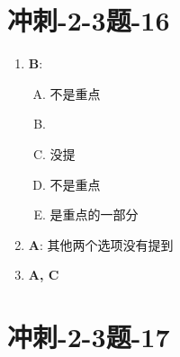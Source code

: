 \section{冲刺-2-3题-16}

  \begin{enumerate}
    \item \textbf{B}:
    \begin{enumerate}[A.]
      \item 不是重点
      \item %
      \item 没提
      \item 不是重点
      \item {}是重点的一部分
    \end{enumerate}

    \item \textbf{A}: 其他两个选项没有提到
    \item \textbf{A, C}
  \end{enumerate}

\section{冲刺-2-3题-17}